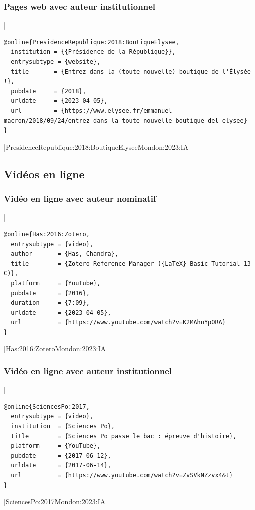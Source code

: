 \documentclass{article}
\begin{document}
\subsubsection{Pages web avec auteur institutionnel}

|
\begin{verbatim}
@online{PresidenceRepublique:2018:BoutiqueElysee,
  institution = {{Présidence de la République}},
  entrysubtype = {website},
  title       = {Entrez dans la (toute nouvelle) boutique de l'Élysée !},
  pubdate     = {2018},
  urldate     = {2023-04-05},
  url         = {https://www.elysee.fr/emmanuel-macron/2018/09/24/entrez-dans-la-toute-nouvelle-boutique-del-elysee}
}
\end{verbatim}
|{PresidenceRepublique:2018:BoutiqueElysee}{Mondon:2023:IA}

\subsection{Vidéos en ligne}

\subsubsection{Vidéo en ligne avec auteur nominatif}

|
\begin{verbatim}
@online{Has:2016:Zotero,
  entrysubtype = {video},
  author       = {Has, Chandra},
  title        = {Zotero Reference Manager ({LaTeX} Basic Tutorial-13 C)},
  platform     = {YouTube},
  pubdate      = {2016},
  duration     = {7:09},
  urldate      = {2023-04-05},
  url          = {https://www.youtube.com/watch?v=K2MAhuYpORA}
}
\end{verbatim}
|{Has:2016:Zotero}{Mondon:2023:IA}

\subsubsection{Vidéo en ligne avec auteur institutionnel}

|
\begin{verbatim}
@online{SciencesPo:2017,
  entrysubtype = {video},
  institution  = {Sciences Po},
  title        = {Sciences Po passe le bac : épreuve d'histoire},
  platform     = {YouTube},
  pubdate      = {2017-06-12},
  urldate      = {2017-06-14},
  url          = {https://www.youtube.com/watch?v=ZvSVkNZzvx4&t}
}
\end{verbatim}
|{SciencesPo:2017}{Mondon:2023:IA}
\end{document}
